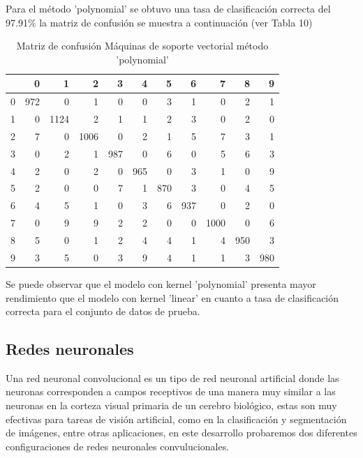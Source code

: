 \documentclass{article}
\begin{document}
Para el método 'polynomial' se obtuvo una tasa de clasificación correcta del 97.91\% la matriz de confusión se muestra a continuación (ver Tabla 10)

\begin{table}[H]
\caption{\small{Matriz de confusión Máquinas de soporte vectorial método 'polynomial'}}
\centering
\begin{tabular}{r|rrrrrrrrrr}
  \hline
 & 0 & 1 & 2 & 3 & 4 & 5 & 6 & 7 & 8 & 9 \\ 
  \hline
0 & 972 &   0 &   1 &   0 &   0 &   3 &   1 &   0 &   2 &   1 \\ 
  1 &   0 & 1124 &   2 &   1 &   1 &   2 &   3 &   0 &   2 &   0 \\ 
  2 &   7 &   0 & 1006 &   0 &   2 &   1 &   5 &   7 &   3 &   1 \\ 
  3 &   0 &   2 &   1 & 987 &   0 &   6 &   0 &   5 &   6 &   3 \\ 
  4 &   2 &   0 &   2 &   0 & 965 &   0 &   3 &   1 &   0 &   9 \\ 
  5 &   2 &   0 &   0 &   7 &   1 & 870 &   3 &   0 &   4 &   5 \\ 
  6 &   4 &   5 &   1 &   0 &   3 &   6 & 937 &   0 &   2 &   0 \\ 
  7 &   0 &   9 &   9 &   2 &   2 &   0 &   0 & 1000 &   0 &   6 \\ 
  8 &   5 &   0 &   1 &   2 &   4 &   4 &   1 &   4 & 950 &   3 \\ 
  9 &   3 &   5 &   0 &   3 &   9 &   4 &   1 &   1 &   3 & 980 \\ 
   \hline
\end{tabular}
\end{table}

Se puede observar que el modelo con kernel 'polynomial' presenta mayor rendimiento que el modelo con kernel 'linear' en cuanto a tasa de clasificación correcta para el conjunto de datos de prueba.





\subsection{Redes neuronales}

Una red neuronal convolucional es un tipo de red neuronal artificial donde las neuronas corresponden a campos receptivos de una manera muy similar a las neuronas en la corteza visual primaria de un cerebro biológico, estas son muy efectivas para tareas de visión artificial, como en la clasificación y segmentación de imágenes, entre otras aplicaciones, en este desarrollo probaremos dos diferentes configuraciones de redes neuronales convulucionales.
\end{document}
